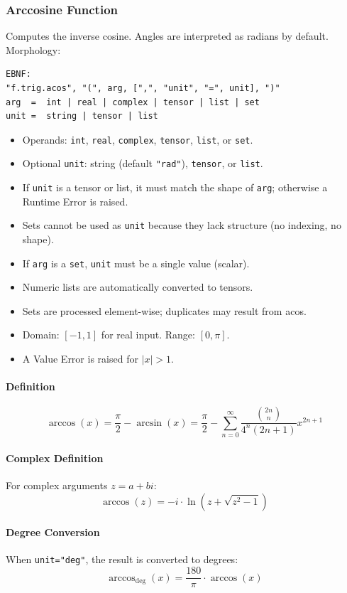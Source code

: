 \subsubsection{Arccosine Function}
Computes the inverse cosine. Angles are interpreted as radians by default.\\
Morphology:
\begin{verbatim}
EBNF:
"f.trig.acos", "(", arg, [",", "unit", "=", unit], ")"
arg  =  int | real | complex | tensor | list | set
unit =  string | tensor | list
\end{verbatim}
\begin{itemize}
\item Operands: \texttt{int}, \texttt{real}, \texttt{complex}, \texttt{tensor}, \texttt{list}, or \texttt{set}.
\item Optional \texttt{unit}: string (default \texttt{"rad"}), \texttt{tensor}, or \texttt{list}.
\item If \texttt{unit} is a tensor or list, it must match the shape of \texttt{arg}; otherwise a Runtime Error is raised.
\item Sets cannot be used as \texttt{unit} because they lack structure (no indexing, no shape).
\item If \texttt{arg} is a \texttt{set}, \texttt{unit} must be a single value (scalar).
\item Numeric lists are automatically converted to tensors.
\item Sets are processed element-wise; duplicates may result from acos.
\item Domain: $[-1, 1]$ for real input. Range: $[0, \pi]$.
\item A Value Error is raised for $|x| > 1$.
\end{itemize}

\paragraph{Definition}
\[
\arccos(x) = \frac{\pi}{2} - \arcsin(x) = \frac{\pi}{2} - \sum_{n=0}^{\infty} \frac{\binom{2n}{n}}{4^n (2n+1)} x^{2n+1}
\]

\paragraph{Complex Definition}
For complex arguments $z = a + bi$:
\[
\arccos(z) = -i \cdot \ln\left(z + \sqrt{z^2 - 1}\right)
\]

\paragraph{Degree Conversion}
When \texttt{unit="deg"}, the result is converted to degrees:
\[
\arccos_{\text{deg}}(x) = \frac{180}{\pi} \cdot \arccos(x)
\]

